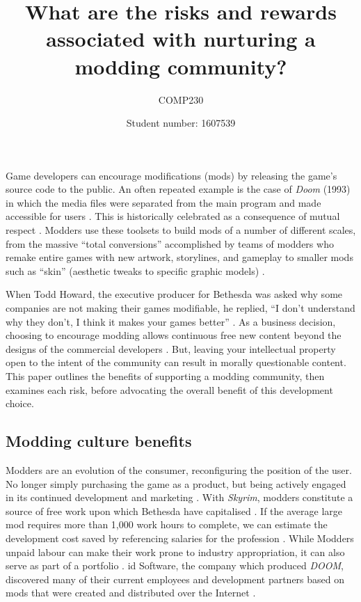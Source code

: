 \documentclass{scrartcl}
\title{What are the risks and rewards associated with nurturing a modding community?}
\subtitle{COMP230}
\author{Student number: 1607539}
\begin{document}
\maketitle

Game developers can encourage modifications (mods) by releasing the game's source code to the public. An often repeated example is the case of \textit{Doom} (1993) in which the media files were separated from the main program and made accessible for users \cite{sotamaa2010game}. This is historically celebrated as a consequence of mutual respect \cite{hong2013game}. Modders use these toolsets to build mods of a number of different scales, from the massive ``total conversions'' accomplished by teams of modders who remake entire games with new artwork, storylines, and gameplay to smaller mods such as ``skin'' (aesthetic tweaks to specific graphic models) \cite{hong2014becoming}.  

When Todd Howard, the executive producer for Bethesda was asked why some companies are not making their games modifiable, he replied, ``I don't understand why they don't, I think it makes your games better'' \cite{todd2012}. As a business decision, choosing to encourage modding allows continuous free new content beyond the designs of the commercial developers \cite{postigo2007mods}. But, leaving your intellectual property open to the intent of the community can result in morally questionable content. This paper outlines the benefits of supporting a modding community, then examines each risk, before advocating the overall benefit of this development choice.

\subsection*{Modding culture benefits}

Modders are an evolution of the consumer, reconfiguring the position of the user. No longer simply purchasing the game as a product, but being actively engaged in its continued development and marketing \cite{herman2006your}. With \textit{Skyrim}, modders constitute a source of free work upon which Bethesda have capitalised \cite{hong2013game}. If the average large mod requires more than 1,000 work hours to complete, we can estimate the development cost saved by referencing salaries for the profession \cite{postigo2007mods}. While Modders unpaid labour can make their work prone to industry appropriation, it can also serve as part of a portfolio \cite{nieborg2008mod}. id Software, the company which produced \textit{DOOM}, discovered many of their current employees and development partners based on mods that were created and distributed over the Internet \cite{hong2014becoming}. 
\end{document}
